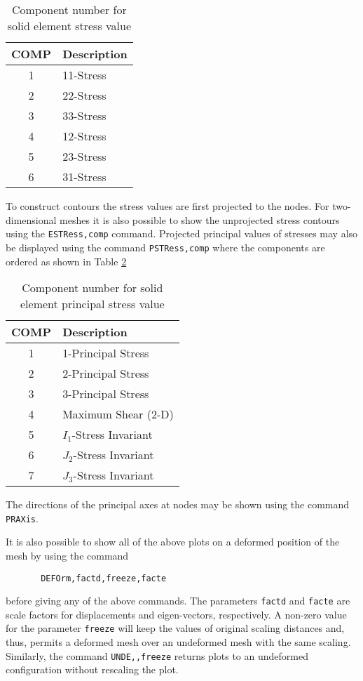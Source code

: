 \begin{table}
\begin{center}
\begin{tabular}{| c | l |} \hline
COMP & Description \\ \hline
1 & 11-Stress \\
2 & 22-Stress \\
3 & 33-Stress \\
4 & 12-Stress \\
5 & 23-Stress \\
6 & 31-Stress \\ \hline
\end{tabular}
\caption{Component number for solid element stress value}
\label{tab18a}
\end{center}
\end{table}
To construct contours the stress values are first projected to the nodes.
For two-di\-men\-sion\-al meshes it is also possible to show the unprojected
stress contours using the {\tt ESTRess,comp} command.
Projected principal values of stresses
may also be displayed using the command {\tt PSTRess,comp}
where the components are ordered as shown in Table \ref{tab18b}

\begin{table}
\begin{center}
\begin{tabular}{| c | l |} \hline
COMP & Description \\ \hline
1 & 1-Principal Stress \\
2 & 2-Principal Stress \\
3 & 3-Principal Stress \\
4 & Maximum Shear (2-D) \\
5 & $I_1$-Stress Invariant\\
6 & $J_2$-Stress Invariant\\
7 & $J_3$-Stress Invariant\\ \hline
\end{tabular}
\caption{Component number for solid element principal stress value}
\label{tab18b}
\end{center}
\end{table}
The directions of the principal axes at nodes may be shown using the
command {\tt PRAXis}.

It is also possible to show all of the above
plots on a deformed position of the mesh by using the command
\begin{verbatim}
       DEFOrm,factd,freeze,facte
\end{verbatim}
before giving any of the above commands.  The parameters {\tt factd} and
{\tt facte} are scale factors for displacements and eigen-vectors, respectively.
A non-zero value for the parameter {\tt freeze} will keep the values of
original scaling distances and, thus, permits a deformed mesh over an undeformed
mesh with the same scaling.  Similarly, the command {\tt UNDE,,freeze} returns
plots to an undeformed configuration without rescaling the plot.

